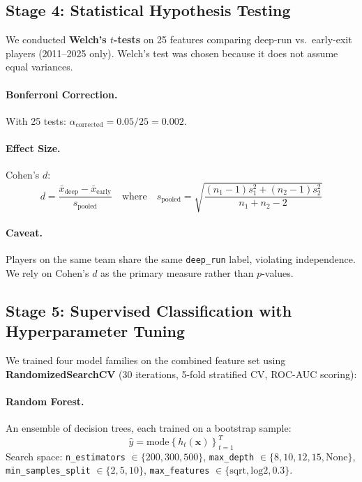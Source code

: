 \documentclass[12pt, a4paper]{article}
\begin{document}
\subsection{Stage 4: Statistical Hypothesis Testing}

We conducted \textbf{Welch's $t$-tests} on 25 features comparing deep-run vs.\ early-exit players (2011--2025 only). Welch's test was chosen because it does not assume equal variances.

\paragraph{Bonferroni Correction.} With 25 tests: $\alpha_{\text{corrected}} = 0.05/25 = 0.002$.

\paragraph{Effect Size.} Cohen's $d$:
\begin{equation}
    d = \frac{\bar{x}_{\text{deep}} - \bar{x}_{\text{early}}}{s_{\text{pooled}}}
    \quad\text{where}\quad
    s_{\text{pooled}} = \sqrt{\frac{(n_1 - 1)s_1^2 + (n_2 - 1)s_2^2}{n_1 + n_2 - 2}}
\end{equation}

\paragraph{Caveat.} Players on the same team share the same \texttt{deep\_run} label, violating independence. We rely on Cohen's $d$ as the primary measure rather than $p$-values.

\subsection{Stage 5: Supervised Classification with Hyperparameter Tuning}

We trained four model families on the combined feature set using \textbf{RandomizedSearchCV} (30 iterations, 5-fold stratified CV, ROC-AUC scoring):

\paragraph{Random Forest.} An ensemble of decision trees, each trained on a bootstrap sample:
\begin{equation}
    \hat{y} = \text{mode}\left\{ h_t(\mathbf{x}) \right\}_{t=1}^{T}
\end{equation}
Search space: \texttt{n\_estimators} $\in \{200, 300, 500\}$, \texttt{max\_depth} $\in \{8, 10, 12, 15, \text{None}\}$, \texttt{min\_samples\_split} $\in \{2, 5, 10\}$, \texttt{max\_features} $\in \{\text{sqrt}, \text{log2}, 0.3\}$.
\end{document}
